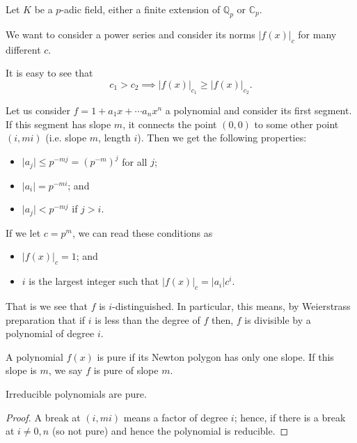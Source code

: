 Let $K$ be a $p$-adic field, either a finite extension of $\mathbb{Q}_p$ or $\mathbb{C}_p$.

We want to consider a power series and consider its norms $\lvert f(x) \rvert_c$ for many different
$c$.

It is easy to see that
\[
c_1 > c_2 \implies \lvert f(x) \rvert_{c_1} \geq \lvert f(x) \rvert_{c_2}.
\]

Let us consider $f = 1 + a_1 x + \cdots a_n x^n$ a polynomial and consider its first segment. If this
segment has slope $m$, it connects the point $(0,0)$ to some other point $(i, mi)$ (i.e. slope $m$,
length $i$). Then we get the following properties:
\begin{itemize}
  \item $\lvert a_j \rvert \leq p^{-mj} = (p^{-m})^j$  for all $j$;
  \item $\lvert a_i \rvert = p^{-mi}$; and
  \item $\lvert a_j \rvert < p^{-mj}$ if $j > i$.
\end{itemize}

If we let $c = p^m$, we can read these conditions as
\begin{itemize}
  \item $\lvert f(x) \rvert_c = 1$; and
  \item $i$ is the largest integer such that $\lvert f(x) \rvert_c = \lvert a_i \rvert c^i.$
\end{itemize}

That is we see that $f$ is $i$-distinguished. In particular, this means, by Weierstrass preparation
that if $i$ is less than the degree of $f$ then, $f$ is divisible by a polynomial of degree $i$.


\begin{definition}
  A polynomial $f(x)$ is pure if its Newton polygon has only one slope. If this slope is $m$, we say
  $f$ is pure of slope $m$.
\end{definition}

\begin{proposition}
  Irreducible polynomials are pure.
\end{proposition}

\begin{proof}
  A break at $(i,mi)$ means a factor of degree $i$; hence, if there is a break at $i \neq 0, n$
  (so not pure) and hence the polynomial is reducible.
\end{proof}

